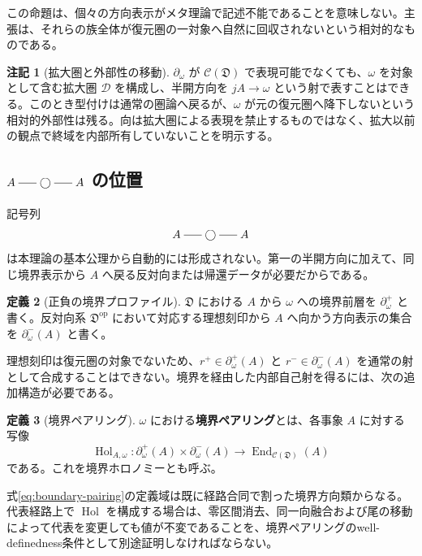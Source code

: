 \documentclass[a4paper,11pt]{ltjsarticle}
\theoremstyle{definition}
\newtheorem{definition}{定義}[section]
\newtheorem{remark}[definition]{注記}
\theoremstyle{plain}
\newcommand{\Hol}{\operatorname{Hol}}
\newcommand{\dfix}{\bigcirc}
\newcommand{\dline}{\mathrel{\rule[0.55ex]{1.6em}{0.4pt}}}
\begin{document}
この命題は、個々の方向表示がメタ理論で記述不能であることを意味しない。主張は、それらの族全体が復元圏の一対象へ自然に回収されないという相対的なものである。

\begin{remark}[拡大圏と外部性の移動]
$\partial_\omega$ が $\mathcal C(\mathfrak D)$ で表現可能でなくても、$\omega$ を対象として含む拡大圏 $\mathcal D$ を構成し、半開方向を $jA\to\omega$ という射で表すことはできる。このとき型付けは通常の圏論へ戻るが、$\omega$ が元の復元圏へ降下しないという相対的外部性は残る。向は拡大圏による表現を禁止するものではなく、拡大以前の観点で終域を内部所有していないことを明示する。
\end{remark}

\subsection{\texorpdfstring{$A\dline\dfix\dline A$}{A---○---A} の位置}

記号列
\[
 A\dline\dfix\dline A
\]
は本理論の基本公理から自動的には形成されない。第一の半開方向に加えて、同じ境界表示から $A$ へ戻る反対向または帰還データが必要だからである。

\begin{definition}[正負の境界プロファイル]
$\mathfrak D$ における $A$ から $\omega$ への境界前層を $\partial_\omega^+$ と書く。反対向系 $\mathfrak D^{\mathrm{op}}$ において対応する理想刻印から $A$ へ向かう方向表示の集合を $\partial_\omega^-(A)$ と書く。
\end{definition}

理想刻印は復元圏の対象でないため、$r^+\in\partial_\omega^+(A)$ と $r^-\in\partial_\omega^-(A)$ を通常の射として合成することはできない。境界を経由した内部自己射を得るには、次の追加構造が必要である。

\begin{definition}[境界ペアリング]
$\omega$ における\textbf{境界ペアリング}とは、各事象 $A$ に対する写像
\begin{equation}
 \Hol_{A,\omega}:
 \partial_\omega^+(A)
 \times
 \partial_\omega^-(A)
 \longrightarrow
 \operatorname{End}_{\mathcal C(\mathfrak D)}(A)
 \label{eq:boundary-pairing}
\end{equation}
である。これを境界ホロノミーとも呼ぶ。
\end{definition}

式\eqref{eq:boundary-pairing}の定義域は既に経路合同で割った境界方向類からなる。代表経路上で $\Hol$ を構成する場合は、零区間消去、同一向融合および尾の移動によって代表を変更しても値が不変であることを、境界ペアリングのwell-definedness条件として別途証明しなければならない。
\end{document}
